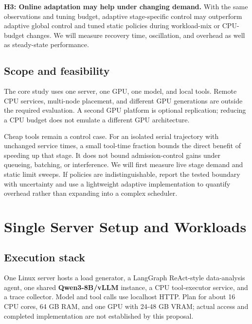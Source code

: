 \documentclass[10pt]{article}
\begin{document}
\textbf{H3: Online adaptation may help under changing demand.} With the
same observations and tuning budget, adaptive stage-specific control may
outperform adaptive global control and tuned static policies during
workload-mix or CPU-budget changes. We will measure recovery time,
oscillation, and overhead as well as steady-state performance.

\hypertarget{scope-and-feasibility}{%
\subsection{Scope and feasibility}\label{scope-and-feasibility}}

The core study uses one server, one GPU, one model, and local tools.
Remote CPU services, multi-node placement, and different GPU generations
are outside the required evaluation. A second GPU platform is optional
replication; reducing a CPU budget does not emulate a different GPU
architecture.

Cheap tools remain a control case. For an isolated serial trajectory
with unchanged service times, a small tool-time fraction bounds the
direct benefit of speeding up that stage. It does not bound
admission-control gains under queueing, batching, or interference. We
will first measure live stage demand and static limit sweeps. If
policies are indistinguishable, report the tested boundary with
uncertainty and use a lightweight adaptive implementation to quantify
overhead rather than expanding into a complex scheduler.

\hypertarget{single-server-setup-and-workloads}{%
\section{Single Server Setup and
Workloads}\label{single-server-setup-and-workloads}}

\hypertarget{execution-stack}{%
\subsection{Execution stack}\label{execution-stack}}

One Linux server hosts a load generator, a LangGraph ReAct-style
data-analysis agent, one shared \textbf{Qwen3-8B/vLLM} instance, a CPU
tool-executor service, and a trace collector. Model and tool calls use
localhost HTTP. Plan for about 16 CPU cores, 64 GB RAM, and one GPU with
24-48 GB VRAM; actual access and completed implementation are not
established by this proposal.
\end{document}
